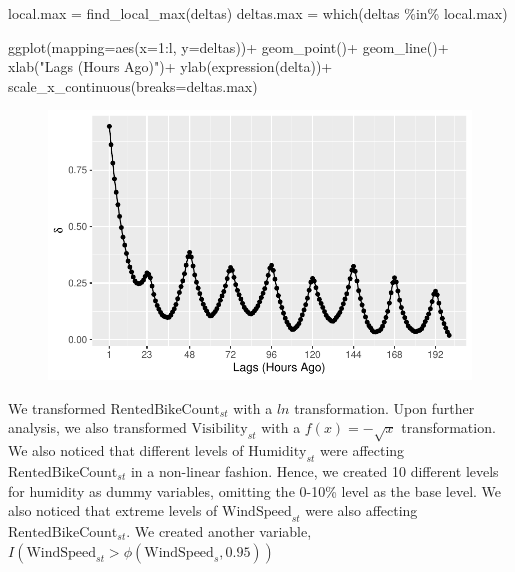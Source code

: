 \documentclass[
  letterpaper,
  DIV=11,
  numbers=noendperiod]{scrartcl}
\newenvironment{Shaded}{\begin{snugshade}}{\end{snugshade}}
\newcommand{\AttributeTok}[1]{\textcolor[rgb]{0.40,0.45,0.13}{#1}}
\newcommand{\DecValTok}[1]{\textcolor[rgb]{0.68,0.00,0.00}{#1}}
\newcommand{\FunctionTok}[1]{\textcolor[rgb]{0.28,0.35,0.67}{#1}}
\newcommand{\NormalTok}[1]{\textcolor[rgb]{0.00,0.23,0.31}{#1}}
\newcommand{\OtherTok}[1]{\textcolor[rgb]{0.00,0.23,0.31}{#1}}
\newcommand{\SpecialCharTok}[1]{\textcolor[rgb]{0.37,0.37,0.37}{#1}}
\newcommand{\StringTok}[1]{\textcolor[rgb]{0.13,0.47,0.30}{#1}}
\begin{document}
\begin{Shaded}
\begin{Highlighting}[]
\NormalTok{local.max }\OtherTok{=} \FunctionTok{find\_local\_max}\NormalTok{(deltas)}
\NormalTok{deltas.max }\OtherTok{=} \FunctionTok{which}\NormalTok{(deltas }\SpecialCharTok{\%in\%}\NormalTok{ local.max)}

\FunctionTok{ggplot}\NormalTok{(}\AttributeTok{mapping=}\FunctionTok{aes}\NormalTok{(}\AttributeTok{x=}\DecValTok{1}\SpecialCharTok{:}\NormalTok{l, }\AttributeTok{y=}\NormalTok{deltas))}\SpecialCharTok{+}
  \FunctionTok{geom\_point}\NormalTok{()}\SpecialCharTok{+}
  \FunctionTok{geom\_line}\NormalTok{()}\SpecialCharTok{+}
  \FunctionTok{xlab}\NormalTok{(}\StringTok{"Lags (Hours Ago)"}\NormalTok{)}\SpecialCharTok{+}
  \FunctionTok{ylab}\NormalTok{(}\FunctionTok{expression}\NormalTok{(delta))}\SpecialCharTok{+}
  \FunctionTok{scale\_x\_continuous}\NormalTok{(}\AttributeTok{breaks=}\NormalTok{deltas.max)}
\end{Highlighting}
\end{Shaded}

\begin{figure}[H]

{\centering \includegraphics{seoul_files/figure-pdf/unnamed-chunk-7-1.pdf}

}

\end{figure}

We transformed \(\text{RentedBikeCount}_{st}\) with a \(ln\)
transformation. Upon further analysis, we also transformed
\(\text{Visibility}_{st}\) with a \(f(x)=-\sqrt{x}\) transformation. We
also noticed that different levels of \(\text{Humidity}_{st}\) were
affecting \(\text{RentedBikeCount}_{st}\) in a non-linear fashion.
Hence, we created 10 different levels for humidity as dummy variables,
omitting the 0-10\% level as the base level. We also noticed that
extreme levels of \(\text{WindSpeed}_{st}\) were also affecting
\(\text{RentedBikeCount}_{st}\). We created another variable,
\(I(\text{WindSpeed}_{st} > \phi(\text{WindSpeed}_s,0.95))\)
\end{document}
